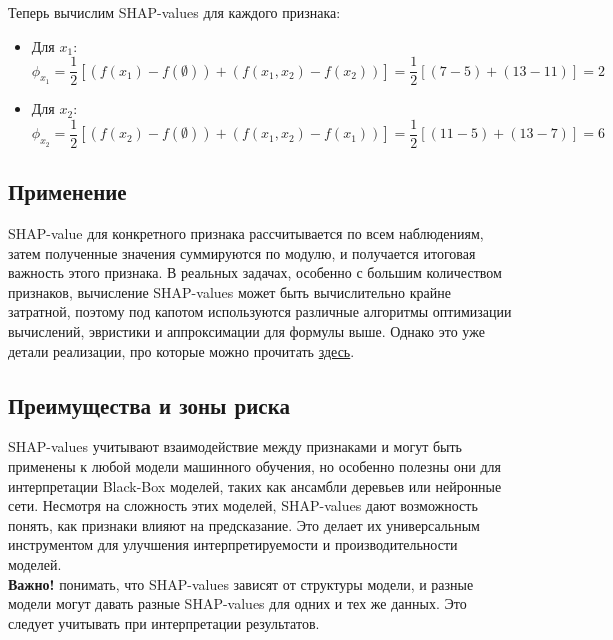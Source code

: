 Теперь вычислим SHAP-values для каждого признака:
\begin{itemize}
    \item Для $x_1$:  
        $$
        \phi_{x_1} = \frac{1}{2} \left[ (f(x_1) - f(\emptyset)) + (f(x_1, x_2) - f(x_2)) \right] = \frac{1}{2} \left[ (7 - 5) + (13 - 11) \right] = 2
        $$
    \item Для $x_2$:
        $$
        \phi_{x_2} = \frac{1}{2} \left[ (f(x_2) - f(\emptyset)) + (f(x_1, x_2) - f(x_1)) \right] = \frac{1}{2} \left[ (11 - 5) + (13 - 7) \right] = 6
        $$
\end{itemize}

\subsection*{Применение}
SHAP-value для конкретного признака рассчитывается по всем наблюдениям, затем полученные значения суммируются по модулю, и получается итоговая важность этого признака.
В реальных задачах, особенно с большим количеством признаков, вычисление SHAP-values может быть вычислительно крайне затратной, поэтому под капотом используются различные алгоритмы оптимизации вычислений, эвристики и аппроксимации для формулы выше. Однако это уже детали реализации, про которые можно прочитать \href{https://github.com/shap/shap}{здесь}.

\subsection*{Преимущества и зоны риска}
SHAP-values учитывают взаимодействие между признаками и могут быть применены к любой модели машинного обучения, но особенно полезны они для интерпретации Black-Box моделей, таких как ансамбли деревьев или нейронные сети. Несмотря на сложность этих моделей, SHAP-values дают возможность понять, как признаки влияют на предсказание. Это делает их универсальным инструментом для улучшения интерпретируемости и производительности моделей.\\
\textbf{Важно!} понимать, что SHAP-values зависят от структуры модели, и разные модели могут давать разные SHAP-values для одних и тех же данных. Это следует учитывать при интерпретации результатов.

